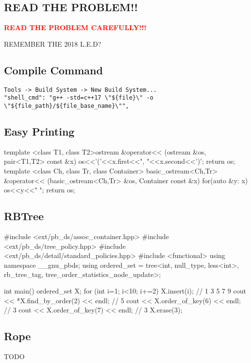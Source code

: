 \subsection{READ THE PROBLEM!!}
{\Large \textbf{\textcolor{red}{READ THE PROBLEM CAREFULLY!!!}}}

REMEMBER THE 2018 L.E.D?

\subsection{Compile Command}
\begin{verbatim}
Tools -> Build System -> New Build System...
"shell_cmd": "g++ -std=c++17 \"${file}\" -o
\"${file_path}/${file_base_name}\"",
\end{verbatim}

\subsection{Easy Printing}
\begin{cpp}
template <class T1, class T2>ostream &operator<<
  (ostream &os, pair<T1,T2> const &x){
  os<<'('<<x.first<<", "<<x.second<<')'; return os;
}
template <class Ch, class Tr, class Container>
  basic_ostream<Ch,Tr> &operator<<
  (basic_ostream<Ch,Tr> &os, Container const &x){
  for(auto &y: x) os<<y<<" "; return os;
}
\end{cpp}

\subsection{RBTree}
\begin{cpp}
#include <ext/pb_ds/assoc_container.hpp>
#include <ext/pb_ds/tree_policy.hpp>
#include <ext/pb_ds/detail/standard_policies.hpp>
#include <functional>
using namespace __gnu_pbds;
using ordered_set = tree<int, null_type, less<int>,
  rb_tree_tag, tree_order_statistics_node_update>;

int main(){
  ordered_set X;
  for (int i=1; i<10; i+=2) X.insert(i); // 1 3 5 7 9
  cout << *X.find_by_order(2) << endl; // 5
  cout << X.order_of_key(6) << endl; // 3
  cout << X.order_of_key(7) << endl; // 3
  X.erase(3);
}
\end{cpp}

\subsection{Rope}

TODO